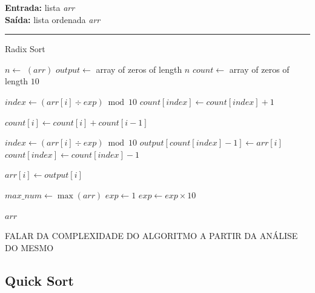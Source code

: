 \documentclass[conference]{IEEEtran}
\begin{document}
\begin{algorithm}[H]
    \raggedright
    \vspace{.1em}
    \textbf{Entrada:} lista \textit{arr} \\
    \textbf{Saída:} lista ordenada \textit{arr} \\
    \vspace{.5em}
    \hrule 
    \caption{Radix Sort}
    \begin{algorithmic}[1]
            \State $n \gets$ $(arr)$
            \State $output \gets$ array of zeros of length $n$
            \State $count \gets$ array of zeros of length $10$
    
                \State $index \gets (arr[i] \div exp) \bmod 10$
                \State $count[index] \gets count[index] + 1$
            \EndFor
    
                \State $count[i] \gets count[i] + count[i - 1]$
            \EndFor
    
                \State $index \gets (arr[i] \div exp) \bmod 10$
                \State $output[count[index] - 1] \gets arr[i]$
                \State $count[index] \gets count[index] - 1$
            \EndFor
    
                \State $arr[i] \gets output[i]$
            \EndFor
        \EndFunction
    
        \State $max\_num \gets \max(arr)$
        \State $exp \gets 1$
            \State {}
            \State $exp \gets exp \times 10$
        \EndWhile
    
        \State \Return $arr$
    \end{algorithmic}
\end{algorithm}

FALAR DA COMPLEXIDADE DO ALGORITMO A PARTIR DA ANÁLISE DO MESMO

\subsection{Quick Sort}
\end{document}
